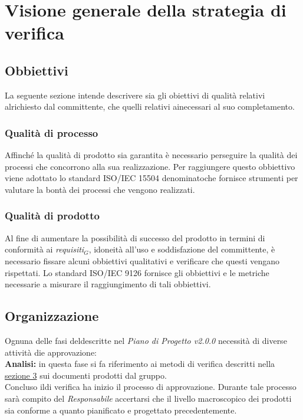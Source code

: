 \chapter{Visione generale della strategia di verifica}
\section{Obbiettivi}
La seguente sezione intende descrivere sia gli obiettivi di qualità relativi alrichiesto dal committente, che quelli relativi ainecessari al suo completamento.
\subsection{Qualità di processo}
Affinché la qualità di prodotto sia garantita è necessario perseguire la qualità dei processi che concorrono alla sua realizzazione. Per raggiungere questo obbiettivo viene adottato lo standard ISO/IEC 15504 denominatoche fornisce strumenti per valutare la bontà dei processi che vengono realizzati.
\subsection{Qualità di prodotto}
Al fine di aumentare la possibilità di successo del prodotto in termini di conformità ai \textit{requisiti$_{G}$}, idoneità all'uso e soddisfazione del committente, è necessario fissare alcuni obbiettivi qualitativi e verificare che questi vengano rispettati.
Lo standard ISO/IEC 9126 fornisce gli obbiettivi e le metriche necessarie a misurare il raggiungimento di tali obbiettivi.
\section{Organizzazione}
Ognuna delle fasi deldescritte nel \textit{Piano di Progetto v2.0.0} necessità di diverse attività die approvazione:\\\newline
 \textbf{Analisi:} in questa fase si fa riferimento ai metodi di verifica descritti nella \hyperref[Metodi]{sezione 3} sui documenti prodotti dal gruppo.\\ \newline
Concluso ildi verifica ha inizio il processo di approvazione. Durante tale processo sarà compito del \textit{Responsabile} accertarsi che il livello macroscopico dei prodotti sia conforme a quanto pianificato e progettato precedentemente.

